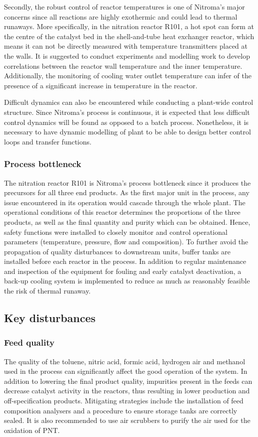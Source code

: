 Secondly, the robust control of reactor temperatures is one of Nitroma's major concerns since all reactions are highly exothermic and could lead to thermal runaways. More specifically, in the nitration reactor R101, a hot spot can form at the centre of the catalyst bed in the shell-and-tube heat exchanger reactor, which means it can not be directly measured with temperature transmitters placed at the walls. It is suggested to conduct experiments and modelling work to develop correlations between the reactor wall temperature and the inner temperature. Additionally, the monitoring of cooling water outlet temperature can infer of the presence of a significant increase in temperature in the reactor.

Difficult dynamics can also be encountered while conducting a plant-wide control structure. Since Nitroma's process is continuous, it is expected that less difficult control dynamics will be found as opposed to a batch process. Nonetheless, it is necessary to have dynamic modelling of plant to be able to design better control loops and transfer functions.


\subsubsection{Process bottleneck} %
The nitration reactor R101 is Nitroma's process bottleneck since it produces the precursors for all three end products. As the first major unit in the process, any issue encountered in its operation would cascade through the whole plant. The operational conditions of this reactor determines the proportions of the three products, as well as the final quantity and purity which can be obtained. Hence, safety functions were installed to closely monitor and control operational parameters (temperature, pressure, flow and composition). To further avoid the propagation of quality disturbances to downstream units, buffer tanks are installed before each reactor in the process. In addition to regular maintenance and inspection of the equipment for fouling and early catalyst deactivation, a back-up cooling system is implemented to reduce as much as reasonably feasible the risk of thermal runaway.


\subsection{Key disturbances} %

\subsubsection{Feed quality}
The quality of the toluene, nitric acid, formic acid, hydrogen air and methanol used in the process can significantly affect the good operation of the system. In addition to lowering the final product quality, impurities present in the feeds can decrease catalyst activity in the reactors, thus resulting in lower production and off-specification products. Mitigating strategies include the installation of feed composition analysers and a procedure to ensure storage tanks are correctly sealed. It is also recommended to use air scrubbers to purify the air used for the oxidation of PNT.

